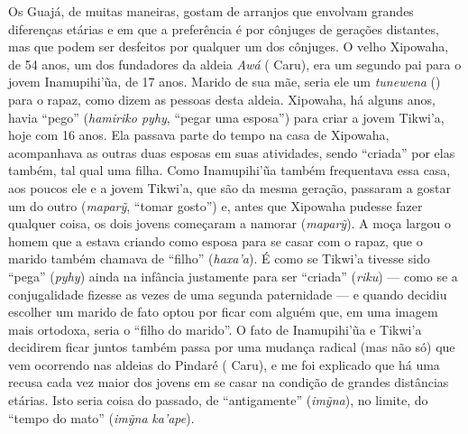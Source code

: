 Os Guajá, de muitas maneiras, gostam de arranjos que envolvam grandes
diferenças etárias e em que a preferência é por cônjuges de gerações
distantes, mas que podem ser desfeitos por qualquer um dos cônjuges. O
velho Xipowaha, de 54 anos, um dos fundadores da aldeia \emph{Awá} (
Caru), era um segundo pai para o jovem Inamupihi'ũa, de 17 anos. Marido
de sua mãe, seria ele um \emph{tunewena} () para o rapaz, como dizem
as pessoas desta aldeia. Xipowaha, há alguns anos, havia ``pego''
(\emph{hamiriko pyhy}, ``pegar uma esposa'') para criar a jovem Tikwi'a,
hoje com 16 anos. Ela passava parte do tempo na casa de Xipowaha,
acompanhava as outras duas esposas em suas atividades, sendo ``criada''
por elas também, tal qual uma filha. Como Inamupihi'ũa também
frequentava essa casa, aos poucos ele e a jovem Tikwi'a, que são da
mesma geração, passaram a gostar um do outro (\emph{maparỹ}, ``tomar
gosto'') e, antes que Xipowaha pudesse fazer qualquer coisa, os dois
jovens começaram a namorar (\emph{maparỹ}). A moça largou o homem que a
estava criando como esposa para se casar com o rapaz, que o marido
também chamava de ``filho'' (\emph{haxa'a}). É como se Tikwi'a tivesse
sido ``pega'' (\emph{pyhy}) ainda na infância justamente para ser ``criada''
(\emph{riku}) --- como se a conjugalidade fizesse as vezes de uma segunda
paternidade --- e quando decidiu escolher um marido de fato optou por
ficar com alguém que, em uma imagem mais ortodoxa, seria o ``filho do
marido''. O fato de Inamupihi'ũa e Tikwi'a decidirem ficar juntos também
passa por uma mudança radical (mas não só) que vem ocorrendo nas aldeias
do Pindaré ( Caru), e me foi explicado que há uma recusa cada vez
maior dos jovens em se casar na condição de grandes distâncias etárias.
Isto seria coisa do passado, de ``antigamente'' (\emph{imỹna}), no
limite, do ``tempo do mato'' (\emph{imỹna} \emph{ka'ape}).

